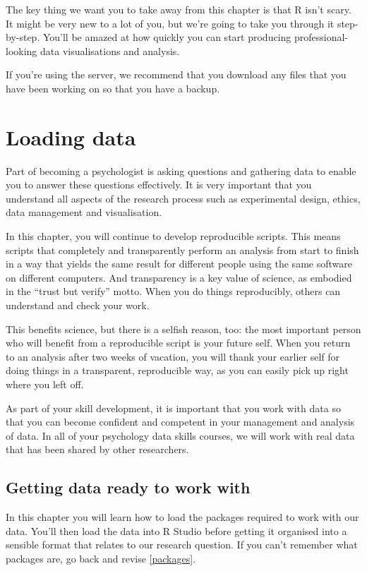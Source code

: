 \documentclass[
  oneside]{book}
\begin{document}
The key thing we want you to take away from this chapter is that R isn't scary. It might be very new to a lot of you, but we're going to take you through it step-by-step. You'll be amazed at how quickly you can start producing professional-looking data visualisations and analysis.

If you're using the server, we recommend that you download any files that you have been working on so that you have a backup.

\hypertarget{loading-data}{%
\chapter{Loading data}\label{loading-data}}

Part of becoming a psychologist is asking questions and gathering data to enable you to answer these questions effectively. It is very important that you understand all aspects of the research process such as experimental design, ethics, data management and visualisation.

In this chapter, you will continue to develop reproducible scripts. This means scripts that completely and transparently perform an analysis from start to finish in a way that yields the same result for different people using the same software on different computers. And transparency is a key value of science, as embodied in the ``trust but verify'' motto. When you do things reproducibly, others can understand and check your work.

This benefits science, but there is a selfish reason, too: the most important person who will benefit from a reproducible script is your future self. When you return to an analysis after two weeks of vacation, you will thank your earlier self for doing things in a transparent, reproducible way, as you can easily pick up right where you left off.

As part of your skill development, it is important that you work with data so that you can become confident and competent in your management and analysis of data. In all of your psychology data skills courses, we will work with real data that has been shared by other researchers.

\hypertarget{getting-data-ready-to-work-with}{%
\section{Getting data ready to work with}\label{getting-data-ready-to-work-with}}

In this chapter you will learn how to load the packages required to work with our data. You'll then load the data into R Studio before getting it organised into a sensible format that relates to our research question. If you can't remember what packages are, go back and revise \ref{packages}.
\end{document}
